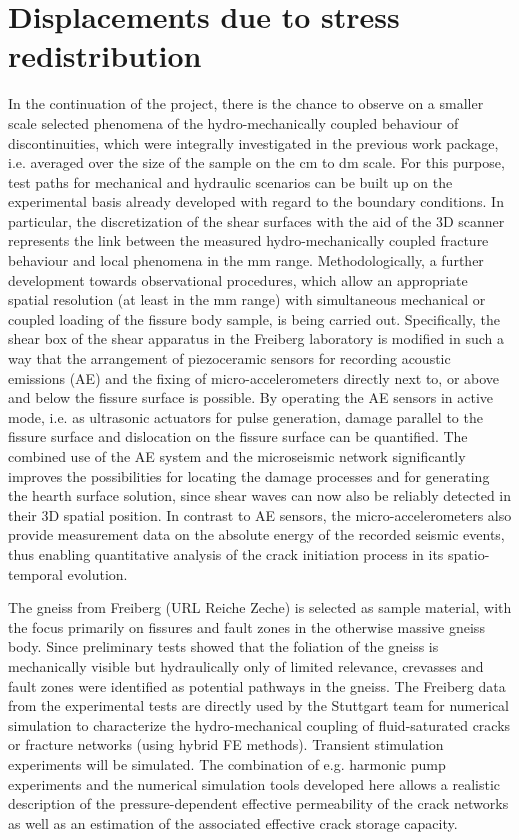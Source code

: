 \section{Displacements due to stress redistribution}

In the continuation of the project, there is the chance to observe on a smaller scale selected phenomena of the hydro-mechanically coupled behaviour of discontinuities, which were integrally investigated in the previous work package, i.e. averaged over the size of the sample on the cm to dm scale. For this purpose, test paths for mechanical and hydraulic scenarios can be built up on the experimental basis already developed with regard to the boundary conditions. 
In particular, the discretization of the shear surfaces with the aid of the 3D scanner represents the link between the measured hydro-mechanically coupled fracture behaviour and local phenomena in the mm range. 
%
Methodologically, a further development towards observational procedures, which allow an appropriate spatial resolution (at least in the mm range) with simultaneous mechanical or coupled loading of the fissure body sample, is being carried out. Specifically, the shear box of the shear apparatus in the Freiberg laboratory is modified in such a way that the arrangement of piezoceramic sensors for recording acoustic emissions (AE) and the fixing of micro-accelerometers directly next to, or above and below the fissure surface is possible. By operating the AE sensors in active mode, i.e. as ultrasonic actuators for pulse generation, damage parallel to the fissure surface and dislocation on the fissure surface can be quantified. The combined use of the AE system and the microseismic network significantly improves the possibilities for locating the damage processes and for generating the hearth surface solution, since shear waves can now also be reliably detected in their 3D spatial position. In contrast to AE sensors, the micro-accelerometers also provide measurement data on the absolute energy of the recorded seismic events, thus enabling quantitative analysis of the crack initiation process in its spatio-temporal evolution.

The gneiss from Freiberg (URL Reiche Zeche) is selected as sample material, with the focus primarily on fissures and fault zones in the otherwise massive gneiss body. Since preliminary tests showed that the foliation of the gneiss is mechanically visible but hydraulically only of limited relevance, crevasses and fault zones were identified as potential pathways in the gneiss.
%
The Freiberg data from the experimental tests are directly used by the Stuttgart team for numerical simulation to characterize the hydro-mechanical coupling of fluid-saturated cracks or fracture networks (using hybrid FE methods). Transient stimulation experiments will be simulated. The combination of e.g. harmonic pump experiments and the numerical simulation tools developed here allows a realistic description of the pressure-dependent effective permeability of the crack networks as well as an estimation of the associated effective crack storage capacity.

